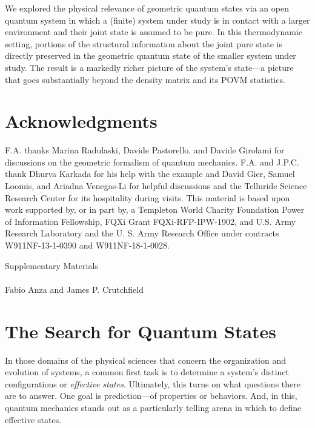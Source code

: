 \documentclass[draft,nofootinbib,pre,twocolumn,showpacs,showkeys,preprintnumbers,floatfix]{revtex4-1}
\newcommand{\1}{\mathbbm{1}}
\begin{document}
We explored the physical relevance of geometric quantum states via an open
quantum system in which a (finite) system under study is in contact with a
larger environment and their joint state is assumed to be pure. In this
thermodynamic setting, portions of the structural information about the joint
pure state is directly preserved in the geometric quantum state of the smaller
system under study. The result is a markedly richer picture of the system's
state---a picture that goes substantially beyond the density matrix and its
POVM statistics.

\section*{Acknowledgments}
\label{sec:acknowledgments}

F.A. thanks Marina Radulaski, Davide Pastorello, and Davide Girolami for
discussions on the geometric formalism of quantum mechanics. F.A. and J.P.C.
thank Dhurva Karkada for his help with the example and David Gier, Samuel
Loomis, and Ariadna Venegas-Li for helpful discussions and the Telluride
Science Research Center for its hospitality during visits.  This material is
based upon work supported by, or in part by, a Templeton World Charity
Foundation Power of Information Fellowship, FQXi Grant FQXi-RFP-IPW-1902, and
U.S. Army Research Laboratory and the U. S. Army Research Office under
contracts W911NF-13-1-0390 and W911NF-18-1-0028.



\makeatletter
\newcommand{\manuallabel}[2]{\def\@currentlabel{#2}\label{#1}}
\makeatother

\clearpage
\appendix
\onecolumngrid

\pagestyle{empty}

\begin{center}
\large{Supplementary Materials}\\
\vspace{0.1in}
\emph{\ourTitle}\\
\vspace{0.1in}
{\small
Fabio Anza and James P. Crutchfield
}
\end{center}

\section{The Search for Quantum States}
\label{sm:QStates}

In those domains of the physical sciences that concern the organization and
evolution of systems, a common first task is to determine a system's distinct
configurations or \emph{effective states}. Ultimately, this turns on what
questions there are to answer. One goal is prediction---of properties or
behaviors. And, in this, quantum mechanics stands out as a particularly telling
arena in which to define effective states.
\end{document}
